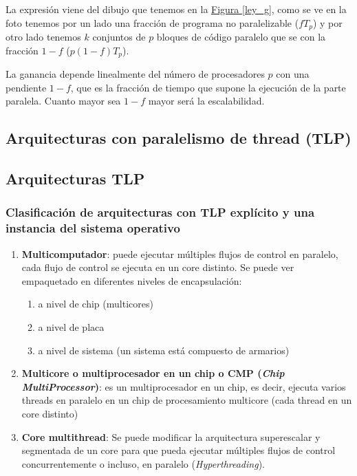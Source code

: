 \documentclass[10pt,a4paper,spanish]{report}
\begin{document}
La expresión viene del dibujo que tenemos en la \hyperref[ley_g]{Figura \ref*{ley_g}}, como se ve en la foto tenemos por un lado una fracción de programa no paralelizable ($fT_p$) y por otro lado tenemos $k$ conjuntos de $p$ bloques de código paralelo que se con la fracción $1-f$ ($p(1-f)T_p$).

La ganancia depende linealmente del número de procesadores $p$ con una pendiente $1-f$, que es la fracción de tiempo que supone la ejecución de la parte paralela. Cuanto mayor sea $1-f$ mayor será la escalabilidad.

\textcolor[rgb]{0.2,0.4,0.8}{\chapter{Arquitecturas con paralelismo de thread (TLP)}}
\setcounter{section}{6}
\textcolor[rgb]{0.2,0.4,0.8}{\section{Arquitecturas TLP}}
\textcolor[rgb]{0.2,0.4,0.8}{\subsection{Clasificación de arquitecturas con TLP explícito y una instancia del sistema operativo}}
\begin{enumerate}[\color{azul}{\bf $\heartsuit$}]
    \item \textbf{\textcolor[rgb]{0.2,0.4,0.8}{Multicomputador}}: puede ejecutar múltiples flujos de control en paralelo, cada flujo de control se ejecuta en un core distinto. Se puede ver empaquetado en diferentes niveles de encapsulación:
    \begin{enumerate}[$\longrightarrow$]
        \item a nivel de chip (multicores)
        \item a nivel de placa
        \item a nivel de sistema (un sistema está compuesto de armarios)
    \end{enumerate}
    \item \textcolor[rgb]{0.2,0.4,0.8}{\textbf{Multicore o multiprocesador en un chip o CMP (\textit{Chip MultiProcessor})}}: es un multiprocesador en un chip, es decir, ejecuta varios threads en paralelo en un chip de procesamiento multicore (cada thread en un core distinto)
    \item \textcolor[rgb]{0.2,0.4,0.8}{\textbf{Core multithread}}: Se puede modificar la arquitectura superescalar y segmentada de un core para que pueda ejecutar múltiples flujos de control concurrentemente o incluso, en paralelo (\textcolor[rgb]{0.2,0.4,0.8}{\textit{Hyperthreading}}). %
\end{enumerate}
\end{document}
